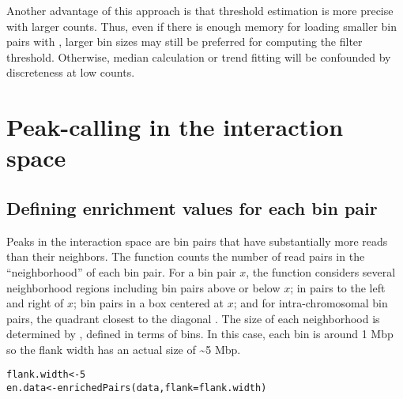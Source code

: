 \documentclass{report}\usepackage[]{graphicx}\usepackage[usenames,dvipsnames]{color}
\newcommand{\hlnum}[1]{\textcolor[rgb]{0.816,0.125,0.439}{#1}}%
\newcommand{\hlopt}[1]{\textcolor[rgb]{0,0,0}{#1}}%
\newcommand{\hlstd}[1]{\textcolor[rgb]{0.251,0.251,0.251}{#1}}%
\newcommand{\hlkwb}[1]{\textcolor[rgb]{0,0,0}{#1}}%
\newcommand{\hlkwc}[1]{\textcolor[rgb]{0.251,0.251,0.251}{#1}}%
\newcommand{\hlkwd}[1]{\textcolor[rgb]{0.878,0.439,0.125}{#1}}%
\newenvironment{knitrout}{}{} %
\begin{document}
\begin{knitrout}
\color{fgcolor}
\end{knitrout}

Another advantage of this approach is that threshold estimation is more precise with larger counts.
Thus, even if there is enough memory for loading smaller bin pairs with , larger bin sizes may still be preferred for computing the filter threshold.
Otherwise, median calculation or trend fitting will be confounded by discreteness at low counts.

\section{Peak-calling in the interaction space}

\subsection{Defining enrichment values for each bin pair}
Peaks in the interaction space are bin pairs that have substantially more reads than their neighbors.
The  function counts the number of read pairs in the ``neighborhood'' of each bin pair.
For a bin pair $x$, the function considers several neighborhood regions including bin pairs above or below $x$; in pairs to the left and right of $x$; bin pairs in a box centered at $x$; and for intra-chromosomal bin pairs, the quadrant closest to the diagonal \cite{rao2014kilobase}.
The size of each neighborhood is determined by , defined in terms of bins.
In this case, each bin is around 1 Mbp so the flank width has an actual size of \textasciitilde{}5 Mbp.

\begin{knitrout}
\color{fgcolor}\begin{kframe}
\begin{alltt}
\hlstd{flank.width} \hlkwb{<-} \hlnum{5}
\hlstd{en.data} \hlkwb{<-} \hlkwd{enrichedPairs}\hlstd{(data,} \hlkwc{flank}\hlstd{=flank.width)}
\end{alltt}
\end{kframe}
\end{knitrout}
\end{document}
